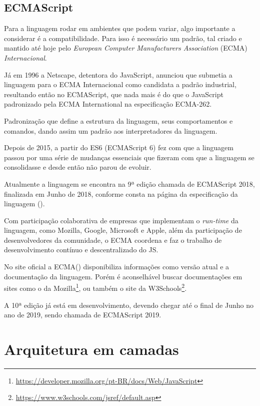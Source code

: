 \documentclass[
	12pt,				%
	openright,			%
	twoside,			%
	a4paper,			%
	english,			%
	brazil				%
	]{abntex2}
\begin{document}
\subsection{ECMAScript}

Para a linguagem rodar em ambientes que podem variar, algo importante a considerar é a compatibilidade. Para isso é necessário um padrão, tal criado e mantido até hoje pelo \textit{European Computer Manufacturers Association} (ECMA) \textit{Internacional}. 

Já em 1996 a Netscape, detentora do JavaScript, anunciou que submetia a linguagem para o ECMA Internacional como candidata a padrão industrial, resultando então no ECMAScript, que nada mais é do que o JavaScript padronizado pela ECMA International na especificação ECMA-262. 

Padronização que define a estrutura da linguagem, seus comportamentos e comandos, dando assim um padrão aos interpretadores da linguagem. 

Depois de 2015, a partir do ES6 (ECMAScript 6) fez com que a linguagem passou por uma série de mudanças essenciais que fizeram com que a linguagem se consolidasse e desde então não parou de evoluir.

Atualmente a linguagem se encontra na 9ª edição chamada de ECMAScript 2018, finalizada em Junho de 2018, conforme consta na página da especificação da linguagem (\citeauthor{ecma_standard}).

Com participação colaborativa de empresas que implementam o \textit{run-time} da linguagem, como Mozilla, Google, Microsoft e Apple, além da participação de desenvolvedores da comunidade, o ECMA coordena e faz o trabalho de desenvolvimento contínuo e descentralizado do JS.

No site oficial a ECMA(\citeauthor{ecma_standard}) disponibiliza informações como versão atual e a documentação da linguagem. Porém é aconselhável buscar documentações em sites como o da Mozilla\footnote{\url{https://developer.mozilla.org/pt-BR/docs/Web/JavaScript}}, ou também o site da W3Schools\footnote{\url{https://www.w3schools.com/jsref/default.asp}}. 

A 10ª edição já está em desenvolvimento, devendo chegar até o final de Junho no ano de 2019, sendo chamada de ECMAScript 2019.

\section{Arquitetura em camadas}
\label{sec:Arquitetura}
\end{document}
